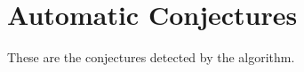 \documentclass{article}%
\begin{document}
%
\normalsize%
\section{Automatic Conjectures}%
\label{sec:AutomaticConjectures}%
These are the conjectures detected by the algorithm.

%
\end{document}

